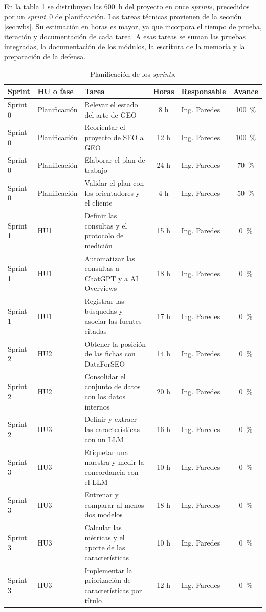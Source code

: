 \documentclass[
11pt, %
codirector, %
]{charter}
\begin{document}
En la tabla \ref{tab:sprints} se distribuyen las 600~h del proyecto en once \textit{sprints}, precedidos por un \textit{sprint}~0 de planificación. Las tareas técnicas provienen de la sección \ref{sec:wbs}. Su estimación en horas es mayor, ya que incorpora el tiempo de prueba, iteración y documentación de cada tarea. A esas tareas se suman las pruebas integradas, la documentación de los módulos, la escritura de la memoria y la preparación de la defensa.

\begin{table}[htpb]
\centering
\caption{Planificación de los \textit{sprints}.}
\label{tab:sprints}
\begin{tabularx}{\linewidth}{@{}|p{1.55cm}|p{2.62cm}|>{\raggedright\arraybackslash}X|c|l|c|@{}}
\hline
\rowcolor[HTML]{C0C0C0}
Sprint & HU o fase & Tarea & Horas & Responsable & Avance \\ \hline
Sprint 0 & Planificación & Relevar el estado del arte de GEO & 8 h & Ing. Paredes & 100~\% \\ \hline
Sprint 0 & Planificación & Reorientar el proyecto de SEO a GEO & 12 h & Ing. Paredes & 100~\% \\ \hline
Sprint 0 & Planificación & Elaborar el plan de trabajo & 24 h & Ing. Paredes & 70~\% \\ \hline
Sprint 0 & Planificación & Validar el plan con los orientadores y el cliente & 4 h & Ing. Paredes & 50~\% \\ \hline
Sprint 1 & HU1 & Definir las consultas y el protocolo de medición & 15 h & Ing. Paredes & 0~\% \\ \hline
Sprint 1 & HU1 & Automatizar las consultas a ChatGPT y a AI Overviews & 18 h & Ing. Paredes & 0~\% \\ \hline
Sprint 1 & HU1 & Registrar las búsquedas y asociar las fuentes citadas & 17 h & Ing. Paredes & 0~\% \\ \hline
Sprint 2 & HU2 & Obtener la posición de las fichas con DataForSEO & 14 h & Ing. Paredes & 0~\% \\ \hline
Sprint 2 & HU2 & Consolidar el conjunto de datos con los datos internos & 20 h & Ing. Paredes & 0~\% \\ \hline
Sprint 2 & HU3 & Definir y extraer las características con un LLM & 16 h & Ing. Paredes & 0~\% \\ \hline
Sprint 3 & HU3 & Etiquetar una muestra y medir la concordancia con el LLM & 10 h & Ing. Paredes & 0~\% \\ \hline
Sprint 3 & HU3 & Entrenar y comparar al menos dos modelos & 18 h & Ing. Paredes & 0~\% \\ \hline
Sprint 3 & HU3 & Calcular las métricas y el aporte de las características & 10 h & Ing. Paredes & 0~\% \\ \hline
Sprint 3 & HU3 & Implementar la priorización de características por título & 12 h & Ing. Paredes & 0~\% \\ \hline
\end{tabularx}
\end{table}
\end{document}
